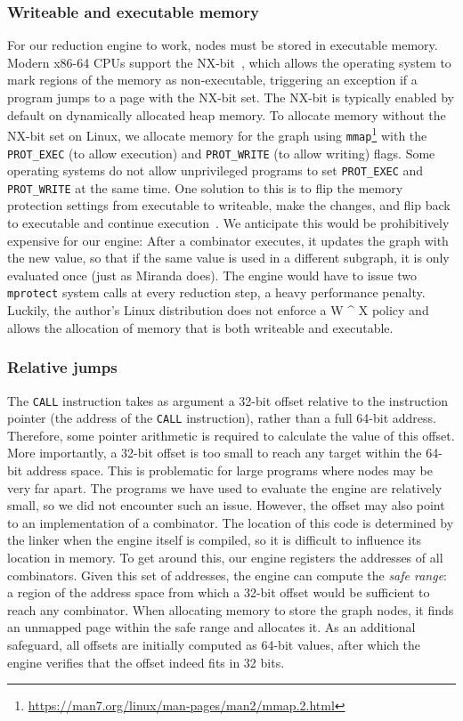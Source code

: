 \documentclass[conference]{IEEEtran}
\begin{document}
\subsubsection{Writeable and executable memory}
For our reduction engine to work, nodes must be stored in executable memory.
Modern x86-64 CPUs support the NX-bit~\cite{paulson_new_2004}, which allows the operating system to mark regions of the memory as non-executable, triggering an exception if a program jumps to a page with the NX-bit set.
The NX-bit is typically enabled by default on dynamically allocated heap memory.
To allocate memory without the NX-bit set on Linux, we allocate memory for the graph using \texttt{mmap}\footnote{\url{https://man7.org/linux/man-pages/man2/mmap.2.html}} with the \texttt{PROT\_EXEC} (to allow execution) and \texttt{PROT\_WRITE} (to allow writing) flags.
Some operating systems do not allow unprivileged programs to set \texttt{PROT\_EXEC} and \texttt{PROT\_WRITE} at the same time.
One solution to this is to flip the memory protection settings from executable to writeable, make the changes, and flip back to executable and continue execution~\cite{de_mooij_wx_2015}.
We anticipate this would be prohibitively expensive for our engine: After a combinator executes, it updates the graph with the new value, so that if the same value is used in a different subgraph, it is only evaluated once (just as Miranda does).
The engine would have to issue two \texttt{mprotect} system calls at every reduction step, a heavy performance penalty.
Luckily, the author's Linux distribution does not enforce a W \^{} X policy and allows the allocation of memory that is both writeable and executable.

\subsubsection{Relative jumps}
The \texttt{CALL} instruction takes as argument a 32-bit offset relative to the instruction pointer (the address of the \texttt{CALL} instruction), rather than a full 64-bit address.
Therefore, some pointer arithmetic is required to calculate the value of this offset.
More importantly, a 32-bit offset is too small to reach any target within the 64-bit address space.
This is problematic for large programs where nodes may be very far apart.
The programs we have used to evaluate the engine are relatively small, so we did not encounter such an issue.
However, the offset may also point to an implementation of a combinator.
The location of this code is determined by the linker when the engine itself is compiled, so it is difficult to influence its location in memory.
To get around this, our engine registers the addresses of all combinators.
Given this set of addresses, the engine can compute the \emph{safe range}: a region of the address space from which a 32-bit offset would be sufficient to reach any combinator.
When allocating memory to store the graph nodes, it finds an unmapped page within the safe range and allocates it.
As an additional safeguard, all offsets are initially computed as 64-bit values, after which the engine verifies that the offset indeed fits in 32 bits.
\end{document}
